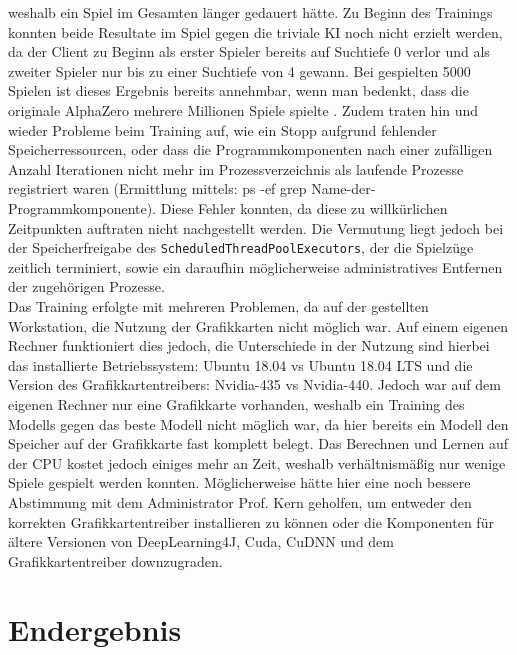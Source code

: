 \documentclass[12pt,a4paper]{article}
\begin{document}
weshalb ein Spiel im Gesamten länger gedauert hätte. Zu Beginn des Trainings konnten beide Resultate im Spiel gegen die triviale KI noch nicht erzielt werden, da der Client zu Beginn als erster Spieler bereits auf Suchtiefe 0 verlor und als zweiter Spieler nur bis zu einer Suchtiefe von 4 gewann. Bei gespielten 5000 Spielen ist dieses Ergebnis bereits annehmbar, wenn man bedenkt, dass die originale AlphaZero mehrere Millionen Spiele spielte \cite{Silver2017}. Zudem traten hin und wieder Probleme beim Training auf, wie ein Stopp aufgrund fehlender Speicherressourcen, oder dass die Programmkomponenten nach einer zufälligen Anzahl Iterationen nicht mehr im Prozessverzeichnis als laufende Prozesse registriert waren (Ermittlung mittels: ps -ef\:  \textbar\: grep \glqq Name-der-Programmkomponente\grqq{}). Diese Fehler konnten, da diese zu willkürlichen Zeitpunkten auftraten nicht nachgestellt werden. Die Vermutung liegt jedoch bei der Speicherfreigabe des \texttt{ScheduledThreadPoolExecutors}, der die Spielzüge zeitlich terminiert, sowie ein daraufhin möglicherweise administratives Entfernen der zugehörigen Prozesse. \\
Das Training erfolgte mit mehreren Problemen, da auf der gestellten Workstation, die Nutzung der Grafikkarten nicht möglich war. Auf einem eigenen Rechner funktioniert dies jedoch, die Unterschiede in der Nutzung sind hierbei das installierte Betriebssystem: Ubuntu 18.04 vs Ubuntu 18.04 LTS und die Version des Grafikkartentreibers: Nvidia-435 vs Nvidia-440. Jedoch war auf dem eigenen Rechner nur eine Grafikkarte vorhanden, weshalb ein Training des Modells gegen das beste Modell nicht möglich war, da hier bereits ein Modell den Speicher auf der Grafikkarte fast komplett belegt. Das Berechnen und Lernen auf der CPU kostet jedoch einiges mehr an Zeit, weshalb verhältnismäßig nur wenige Spiele gespielt werden konnten. Möglicherweise hätte hier eine noch bessere Abstimmung mit dem Administrator Prof. Kern geholfen, um entweder den korrekten Grafikkartentreiber installieren zu können oder die Komponenten für ältere Versionen von DeepLearning4J, Cuda, CuDNN und dem Grafikkartentreiber downzugraden.

\newpage

\section{Endergebnis}
\end{document}
